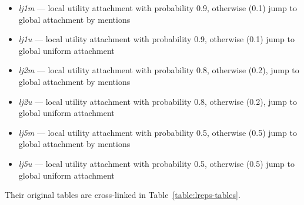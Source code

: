 \documentclass[10pt,oneside]{memoir}
\begin{document}
\begin{itemize}


\item {\itshape lj1m} --- local utility attachment with probability 0.9, otherwise (0.1) jump to global attachment by mentions

\item {\itshape lj1u} --- local utility attachment with probability 0.9, otherwise (0.1) jump to global uniform attachment

\item {\itshape lj2m} --- local utility attachment with probability 0.8, otherwise (0.2), jump to global attachment by mentions

\item {\itshape lj2u} --- local utility attachment with probability 0.8, otherwise (0.2), jump to global uniform attachment

\item {\itshape lj5m} --- local utility attachment with probability 0.5, otherwise (0.5) jump to global attachment by mentions

\item {\itshape lj5u} --- local utility attachment with probability 0.5, otherwise (0.5) jump to global uniform attachment
\end{itemize}

Their original tables are cross-linked in Table~\ref{table:lreps-tables}.
\end{document}
